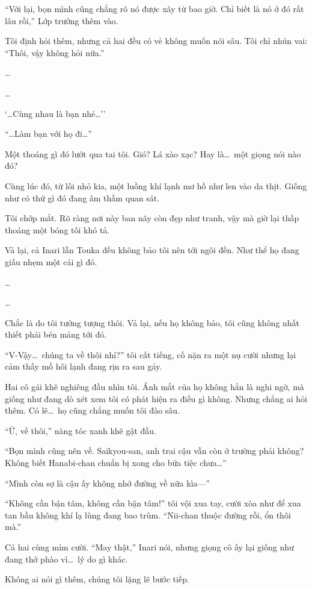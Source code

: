 \documentclass[../main.tex]{subfiles}
\begin{document}
``Với lại, bọn mình cũng chẳng rõ nó được xây từ bao giờ. Chỉ biết là nó ở đó rất lâu rồi,'' Lớp trưởng thêm vào.

Tôi định hỏi thêm, nhưng cả hai đều có vẻ không muốn nói sâu. Tôi chỉ nhún vai: ``Thôi, vậy không hỏi nữa.''

\dots

\dots

`\dots Cùng nhau là bạn nhé\dots''

``\dots Làm bạn với họ đi\dots''

Một thoáng gì đó lướt qua tai tôi. Gió? Lá xào xạc? Hay là\dots\ một giọng nói nào đó?

Cùng lúc đó, từ lối nhỏ kia, một luồng khí lạnh mơ hồ như len vào da thịt. Giống như có thứ gì đó đang âm thầm quan sát.

Tôi chớp mắt. Rõ ràng nơi này ban nãy còn đẹp như tranh, vậy mà giờ lại thấp thoáng một bóng tối khó tả.

Vả lại, cả Inari lẫn Touka đều không bảo tôi nên tới ngôi đền. Như thể họ đang giấu nhẹm một cái gì đó.

\dots

\dots

Chắc là do tôi tưởng tượng thôi. Vả lại, nếu họ không bảo, tôi cũng không nhất thiết phải bén mảng tới đó.

``V-Vậy\dots\ chúng ta về thôi nhỉ?'' tôi cất tiếng, cố nặn ra một nụ cười nhưng lại cảm thấy mồ hôi lạnh đang rịn ra sau gáy.

Hai cô gái khẽ nghiêng đầu nhìn tôi. Ánh mắt của họ không hẳn là nghi ngờ, mà giống như đang dò xét xem tôi có phát hiện ra điều gì không. Nhưng chẳng ai hỏi thêm. Có lẽ\dots\ họ cũng chẳng muốn tôi đào sâu.

``Ừ, về thôi,'' nàng tóc xanh khẽ gật đầu.

``Bọn mình cũng nên về. Saikyou-san, anh trai cậu vẫn còn ở trường phải không? Không biết Hanabi-chan chuẩn bị xong cho bữa tiệc chưa\dots''

``Mình còn sợ là cậu ấy không nhớ đường về nữa kìa---''

``Không cần bận tâm, không cần bận tâm!'' tôi vội xua tay, cười xòa như để xua tan bầu không khí lạ lùng đang bao trùm. ``Nii-chan thuộc đường rồi, ổn thôi mà.''

Cả hai cùng mỉm cười. ``May thật,'' Inari nói, nhưng giọng cô ấy lại giống như đang thở phào vì\dots\ lý do gì khác.

Không ai nói gì thêm, chúng tôi lặng lẽ bước tiếp.
\end{document}
